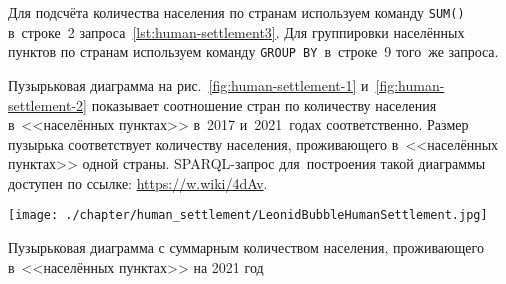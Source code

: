 Для подсчёта количества населения по странам 
используем команду \lstinline|SUM()| в~строке~2 запроса~\ref{lst:human-settlement3}. 
Для группировки населённых пунктов по странам 
используем команду \lstinline|GROUP BY|\, в~строке~9 того~же запроса.

Пузырьковая диаграмма на рис.~\ref{fig:human-settlement-1} и~\ref{fig:human-settlement-2} 
показывает соотношение стран по количеству населения в~<<населённых пунктах>> 
в~2017 и~2021~годах соответственно. 
Размер пузырька соответствует количеству населения, проживающего в~<<населённых пунктах>> одной страны. 
SPARQL-запрос для~построения такой диаграммы доступен по ссылке: \href{https://w.wiki/4dAv}{https://w.wiki/4dAv}.

\begin{marginfigure}[0.0cm]
	\texttt{[image: ./chapter/human\_settlement/LeonidBubbleHumanSettlement.jpg]}
    \caption[Сколько населения проживает в~населённых пунктах, 2021.]{Пузырьковая диаграмма с суммарным количеством населения, проживающего в~<<населённых пунктах>> на 2021 год} 
	\label{fig:human-settlement-2}
\end{marginfigure}




